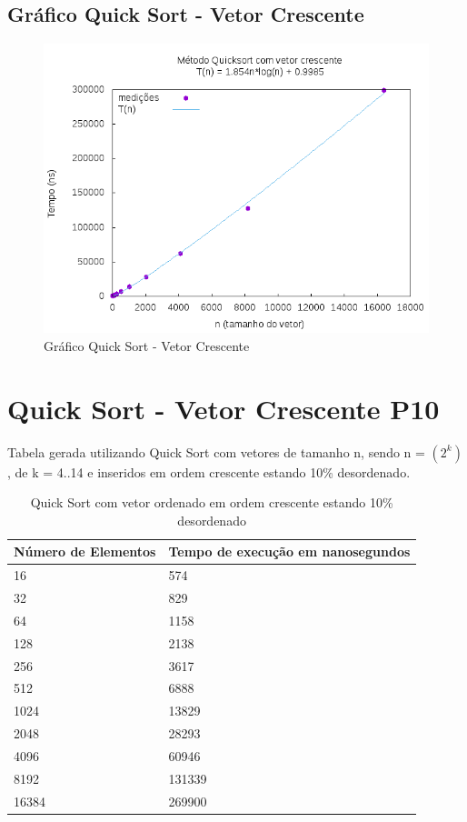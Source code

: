 \documentclass[12pt,a4paper,twoside]{report}
\begin{document}
\subsection{Gráfico Quick Sort - Vetor Crescente}
\begin{figure}[H]
    \centering
    \includegraphics[width=0.7\linewidth]{graficos/QuickSort/vIntCrescente/vIntCrescente.png}
  \caption{Gráfico Quick Sort - Vetor Crescente}
\end{figure}

\section{Quick Sort - Vetor Crescente P10}
Tabela gerada utilizando Quick Sort com vetores de tamanho n, sendo n = $(2^k)$, de k = 4..14 e inseridos em ordem crescente estando 10\% desordenado.
\begin{table}[H]
\centering
\caption{Quick Sort com vetor ordenado em ordem crescente estando 10\% desordenado}
\label{my-label}
\begin{tabular}{|l|l|}
\hline
\multicolumn{1}{|c|}{\textbf{Número de Elementos}} & \multicolumn{1}{c|}{\textbf{Tempo de execução em nanosegundos}} \\ \hline
16 & 574 \\ \hline
32 & 829 \\ \hline
64 & 1158 \\ \hline
128 & 2138 \\ \hline
256 & 3617 \\ \hline
512 & 6888 \\ \hline
1024 & 13829 \\ \hline
2048 & 28293 \\ \hline
4096 & 60946 \\ \hline
8192 & 131339 \\ \hline
16384 & 269900 \\ \hline
\end{tabular}
\end{table}
\end{document}
